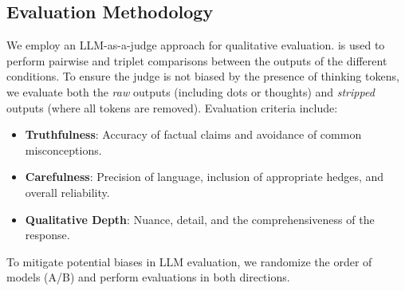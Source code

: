 \subsection{Evaluation Methodology}
We employ an LLM-as-a-judge approach for qualitative evaluation. \gpt is used to perform pairwise and triplet comparisons between the outputs of the different conditions. To ensure the judge is not biased by the presence of thinking tokens, we evaluate both the \textit{raw} outputs (including dots or thoughts) and \textit{stripped} outputs (where all \bst tokens are removed). Evaluation criteria include:
\begin{itemize}[leftmargin=*,itemsep=0pt,topsep=0pt]
    \item {\bf Truthfulness}: Accuracy of factual claims and avoidance of common misconceptions.
    \item {\bf Carefulness}: Precision of language, inclusion of appropriate hedges, and overall reliability.
    \item {\bf Qualitative Depth}: Nuance, detail, and the comprehensiveness of the response.
\end{itemize}
To mitigate potential biases in LLM evaluation, we randomize the order of models (A/B) and perform evaluations in both directions.